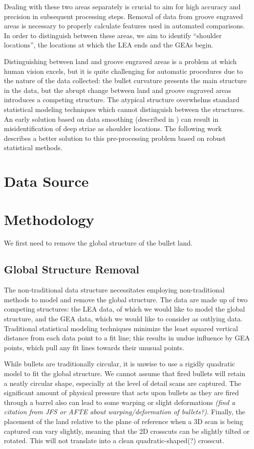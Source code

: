 \documentclass[12pt]{article}
\begin{document}
Dealing with these two areas separately is crucial to aim for high
accuracy and precision in subsequent processing steps. Removal of data
from groove engraved areas is necessary to properly calculate features
used in automated comparisons. In order to distinguish between these
areas, we aim to identify ``shoulder locations'', the locations at which
the LEA ends and the GEAs begin.

Distinguishing between land and groove engraved areas is a problem at
which human vision excels, but it is quite challenging for automatic
procedures due to the nature of the data collected: the bullet curvature
presents the main structure in the data, but the abrupt change between
land and groove engraved areas introduces a competing structure. The
atypical structure overwhelms standard statistical modeling techniques
which cannot distinguish between the structures. An early solution based
on data smoothing (described in \citep{Hare1}) can result in
misidentification of deep striae as shoulder locations. The following
work describes a better solution to this pre-processing problem based on
robust statistical methods.

\section{Data Source}

\section{Methodology}

We first need to remove the global structure of the bullet land.

\subsection{Global Structure Removal}

The non-traditional data structure necessitates employing
non-traditional methods to model and remove the global structure. The
data are made up of two competing structures: the LEA data, of which we
would like to model the global structure, and the GEA data, which we
would like to consider as outlying data. Traditional statistical
modeling techniques minimize the least squared vertical distance from
each data point to a fit line; this results in undue influence by GEA
points, which pull any fit lines towards their unusual points.

While bullets are traditionally circular, it is unwise to use a rigidly
quadratic model to fit the global structure. We cannot assume that fired
bullets will retain a neatly circular shape, especially at the level of
detail scans are captured. The significant amount of physical pressure
that acts upon bullets as they are fired through a barrel also can lead
to some warping or slight deformations \emph{(find a citation from JFS
or AFTE about warping/deformation of bullets?)}. Finally, the placement
of the land relative to the plane of reference when a 3D scan is being
captured can vary slightly, meaning that the 2D crosscuts can be
slightly tilted or rotated. This will not translate into a clean
quadratic-shaped(?) crosscut.
\end{document}
